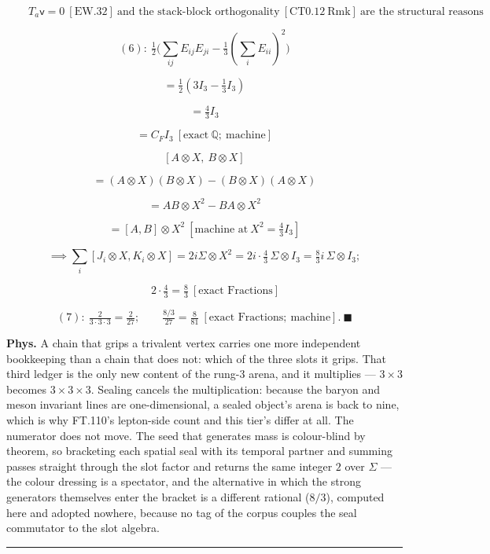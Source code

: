 \begin{theorem}
\[
\qquad T_a\mathsf v=0\ [\mathrm{EW.32}]\ \text{and the stack-block orthogonality}\ [\mathrm{CT0.12}\ \mathrm{Rmk}]\ \text{are the structural reasons}
\]

\[
(6):\ \tfrac12\bigl(\sum_{ij}E_{ij}E_{ji}-\tfrac13(\sum_iE_{ii})^2\bigr)
\]

\[
= \tfrac12(3I_3-\tfrac13I_3)
\]

\[
= \tfrac43I_3
\]

\[
= C_FI_3\ [\text{exact}\ \mathbb Q;\ \text{machine}]
\]

\[
[A\otimes X,\ B\otimes X]
\]

\[
= (A\otimes X)(B\otimes X)-(B\otimes X)(A\otimes X)
\]

\[
= AB\otimes X^2-BA\otimes X^2
\]

\[
= [A,B]\otimes X^2\ [\text{machine at}\ X^2=\tfrac43I_3]
\]

\[
\implies\sum_i[J_i\otimes X,K_i\otimes X]=2i\Sigma\otimes X^2=2i\cdot\tfrac43\,\Sigma\otimes I_3=\tfrac83i\,\Sigma\otimes I_3;
\]

\[
\qquad 2\cdot\tfrac43=\tfrac83\ [\text{exact Fractions}]
\]

\[
(7):\ \tfrac{2}{3\cdot3\cdot3}=\tfrac2{27};\qquad\tfrac{8/3}{27}=\tfrac8{81}\ [\text{exact Fractions};\ \text{machine}].\ \blacksquare
\]

\textbf{Phys.} A chain that grips a trivalent vertex carries one more independent bookkeeping than a chain that does not: which of the three slots it grips. That third ledger is the only new content of the rung-3 arena, and it multiplies — $3\times3$ becomes $3\times3\times3$. Sealing cancels the multiplication: because the baryon and meson invariant lines are one-dimensional, a sealed object's arena is back to nine, which is why FT.110's lepton-side count and this tier's differ at all. The numerator does not move. The seed that generates mass is colour-blind by theorem, so bracketing each spatial seal with its temporal partner and summing passes straight through the slot factor and returns the same integer $2$ over $\Sigma$ — the colour dressing is a spectator, and the alternative in which the strong generators themselves enter the bracket is a different rational ($8/3$), computed here and adopted nowhere, because no tag of the corpus couples the seal commutator to the slot algebra.

\vspace{2pt}\noindent\rule{\textwidth}{0.4pt}\vspace{2pt}

\end{theorem}


